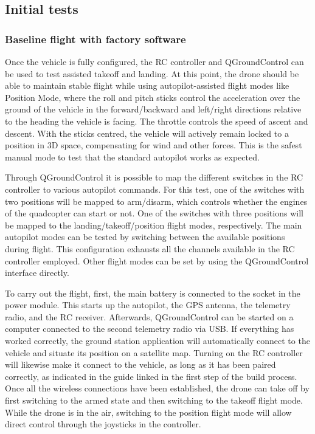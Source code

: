 \subsection{Initial tests}
\label{sec:test-8-flight}


\subsubsection{Baseline flight with factory software}
\label{subsec:fl-test-1}

Once the vehicle is fully configured, the RC controller and QGroundControl can be used to test assisted takeoff and landing.
At this point, the drone should be able to maintain stable flight while using autopilot-assisted flight modes like Position Mode, where the roll and pitch sticks control the acceleration over the ground of the vehicle in the forward/backward and left/right directions relative to the heading the vehicle is facing.
The throttle controls the speed of ascent and descent. 
With the sticks centred, the vehicle will actively remain locked to a position in 3D space, compensating for wind and other forces.
This is the safest manual mode to test that the standard autopilot works as expected.

Through QGroundControl it is possible to map the different switches in the RC controller to various autopilot commands.
For this test, one of the switches with two positions will be mapped to arm/disarm, which controls whether the engines of the quadcopter can start or not. One of the switches with three positions will be mapped to the landing/takeoff/position flight modes, respectively. The main autopilot modes can be tested by switching between the available positions during flight.
This configuration exhausts all the channels available in the RC controller employed.
Other flight modes can be set by using the QGroundControl interface directly.

To carry out the flight, first, the main battery is connected to the socket in the power module.
This starts up the autopilot, the GPS antenna, the telemetry radio, and the RC receiver.
Afterwards, QGroundControl can be started on a computer connected to the second telemetry radio via USB.
If everything has worked correctly, the ground station application will automatically connect to the vehicle and situate its position on a satellite map.
Turning on the RC controller will likewise make it connect to the vehicle, as long as it has been paired correctly, as indicated in the guide linked in the first step of the build process.
Once all the wireless connections have been established, the drone can take off by first switching to the armed state and then switching to the takeoff flight mode.
While the drone is in the air, switching to the position flight mode will allow direct control through the joysticks in the controller.


